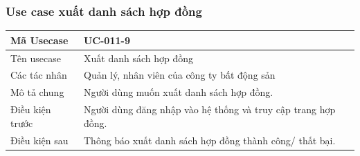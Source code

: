 \documentclass[12pt,a4paper]{article}
\begin{document}
    \subsubsection*{Use case xuất danh sách hợp đồng}
    \begin{table}[H]
        \centering
        \begin{tabular}{|p{3.5cm}|p{11.5cm}|c|}
            \hline
            Mã Usecase      & UC-011-9                                                      \\
            \hline
            Tên usecase     & Xuất danh sách hợp đồng                                       \\
            \hline
            Các tác nhân    & Quản lý, nhân viên của công ty bất động sản                   \\
            \hline
            Mô tả chung     & Người dùng muốn xuất danh sách hợp đồng.                      \\
            \hline

            Điều kiện trước & Người dùng đăng nhập vào hệ thống và truy cập trang hợp đồng. \\
            \hline

            Điều kiện sau   & Thông báo xuất danh sách hợp đồng thành công/ thất bại.       \\
            \hline


\end{tabular}
\end{table}
\end{document}

